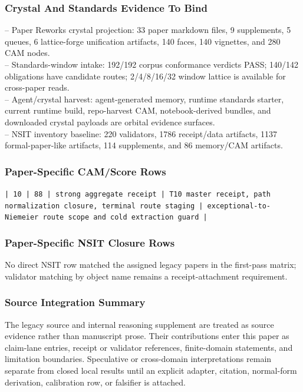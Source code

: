 \documentclass[11pt]{article}
\begin{document}
\subsubsection*{Crystal And Standards Evidence To Bind}

\noindent{}-- Paper Reworks crystal projection: 33 paper markdown files, 9 supplements, 5 queues, 6 lattice-forge unification artifacts, 140 faces, 140 vignettes, and 280 CAM nodes.\\
\noindent{}-- Standards-window intake: 192/192 corpus conformance verdicts PASS; 140/142 obligations have candidate routes; 2/4/8/16/32 window lattice is available for cross-paper reads.\\
\noindent{}-- Agent/crystal harvest: agent-generated memory, runtime standards starter, current runtime build, repo-harvest CAM, notebook-derived bundles, and downloaded crystal payloads are orbital evidence surfaces.\\
\noindent{}-- NSIT inventory baseline: 220 validators, 1786 receipt/data artifacts, 1137 formal-paper-like artifacts, 114 supplements, and 86 memory/CAM artifacts.\\

\subsubsection*{Paper-Specific CAM/Score Rows}

\noindent\texttt{| 10 | 88 | strong aggregate receipt | T10 master receipt, path normalization closure, terminal route staging | exceptional-to-Niemeier route scope and cold extraction guard |}\\

\subsubsection*{Paper-Specific NSIT Closure Rows}

No direct NSIT row matched the assigned legacy papers in the first-pass matrix; validator matching by object name remains a receipt-attachment requirement.

\subsubsection*{Source Integration Summary}

The legacy source and internal reasoning supplement are treated as source
evidence rather than manuscript prose. Their contributions enter this paper as
claim-lane entries, receipt or validator references, finite-domain statements,
and limitation boundaries. Speculative or cross-domain interpretations remain
separate from closed local results until an explicit adapter, citation,
normal-form derivation, calibration row, or falsifier is attached.
\end{document}
